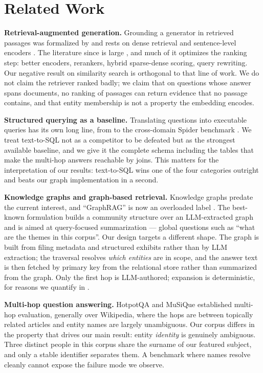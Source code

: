 \section{Related Work}
\label{sec:related}

\textbf{Retrieval-augmented generation.} Grounding a generator in retrieved
passages was formalized by \citet{lewis2020rag} and rests on dense retrieval
\citep{karpukhin2020dpr} and sentence-level encoders \citep{reimers2019sbert}.
The literature since is large \citep{gao2023ragsurvey}, and much of it optimizes
the ranking step: better encoders, rerankers, hybrid sparse-dense scoring, query
rewriting. Our negative result on similarity search is orthogonal to that line of
work. We do not claim the retriever ranked badly; we claim that on questions whose
answer spans documents, no ranking of passages can return evidence that no passage
contains, and that entity membership is not a property the embedding encodes.

\textbf{Structured querying as a baseline.} Translating questions into executable
queries has its own long line, from \citet{zhong2017seq2sql} to the cross-domain
Spider benchmark \citep{yu2018spider}. We treat text-to-SQL not as a competitor to
be defeated but as the strongest available baseline, and we give it the complete
schema including the tables that make the multi-hop answers reachable by joins.
This matters for the interpretation of our results: text-to-SQL wins one of the
four categories outright and beats our graph implementation in a second.

\textbf{Knowledge graphs and graph-based retrieval.} Knowledge graphs
\citep{hogan2021kg} predate the current interest, and ``GraphRAG'' is now an
overloaded label \citep{peng2024graphragsurvey}. The best-known formulation
\citep{edge2024graphrag} builds a community structure over an LLM-extracted graph
and is aimed at query-focused summarization --- global questions such as ``what
are the themes in this corpus''. Our design targets a different shape. The graph
is built from filing metadata and structured exhibits rather than by LLM
extraction; the traversal resolves \emph{which entities} are in scope, and the
answer text is then fetched by primary key from the relational store rather than
summarized from the graph. Only the first hop is LLM-authored; expansion is
deterministic, for reasons we quantify in .

\textbf{Multi-hop question answering.} HotpotQA \citep{ho2020hotpotqa} and MuSiQue
\citep{trivedi2022musique} established multi-hop evaluation, generally over
Wikipedia, where the hops are between topically related articles and entity names
are largely unambiguous. Our corpus differs in the property that drives our main
result: entity \emph{identity} is genuinely ambiguous. Three distinct people in
this corpus share the surname of our featured subject, and only a stable
identifier separates them. A benchmark where names resolve cleanly cannot expose
the failure mode we observe.

